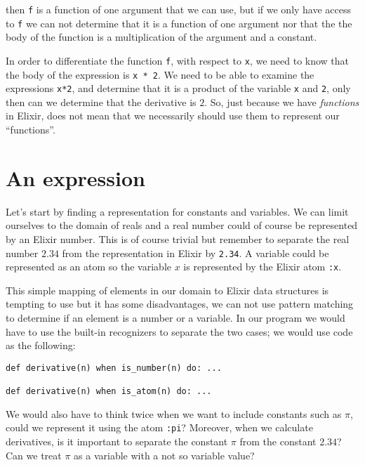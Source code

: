 \documentclass[a4paper,11pt]{article}
\begin{document}
\noindent then {\tt f} is a function of one argument that we can use, but if we
only have access to {\tt f} we can not determine that it is a function
of one argument nor that the the body of the function is a
multiplication of the argument and a constant.

In order to differentiate the function {\tt f}, with respect to {\tt x}, we
need to know that the body of the expression is {\tt x * 2}. We need to
be able to examine the expressions {\tt x*2}, and determine that it is
a product of the variable {\tt x} and {\tt 2}, only then can we
determine that the derivative is $2$. So, just because we have {\em
    functions} in Elixir, does not mean that we necessarily should use
them to represent our ``functions''.



\section{An expression}

Let's start by finding a representation for constants and
variables. We can limit ourselves to the domain of reals and a real
number could of course be represented by an Elixir number. This is of
course trivial but remember to separate the real number $2.34$ from the
representation in Elixir by {\tt 2.34}. A variable could be represented
as an atom so the variable $x$ is represented by the Elixir atom {\tt :x}.

This simple mapping of elements in our domain to Elixir data structures
is tempting to use but it has some disadvantages, we can not use
pattern matching to determine if an element is a number or a
variable. In our program we would have to use the built-in recognizers
to separate the two cases; we would use code as the following:

\begin{verbatim}
def derivative(n) when is_number(n) do: ...

def derivative(n) when is_atom(n) do: ...
\end{verbatim}

We would also have to think twice when we want to include constants
such as $\pi$, could we represent it using the atom {\tt :pi}?
Moreover, when we calculate derivatives, is it important to separate
the constant $\pi$ from the constant $2.34$? Can we treat $\pi$ as a
variable with a not so variable value?
\end{document}
